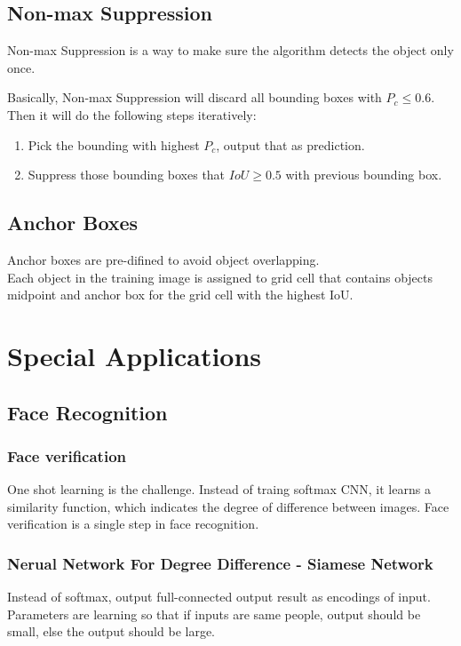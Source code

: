 \documentclass{article}
\begin{document}
	\subsection{Non-max Suppression}
	\begin{flushleft}
		Non-max Suppression is a way to make sure the algorithm detects the object only once.
	\end{flushleft}
	\begin{flushleft}
		Basically, Non-max Suppression will discard all bounding boxes with $P_c \leq 0.6$.\\
		Then it will do the following steps iteratively:
		\begin{enumerate}
			\item Pick the bounding with highest $P_c$, output that as prediction.
			\item Suppress those bounding boxes that $IoU \geq 0.5$ with previous bounding box.
		\end{enumerate}
	\end{flushleft}
	\subsection{Anchor Boxes}
	\begin{flushleft}
		Anchor boxes are pre-difined to avoid object overlapping.\\
		Each object in the training image is assigned to grid cell that contains objects midpoint and anchor box for the grid cell with the highest IoU.
	\end{flushleft}
	
	\section{Special Applications}
	\subsection{Face Recognition}
	\subsubsection{Face verification}
	\begin{flushleft}
		One shot learning is the challenge. Instead of traing softmax CNN, it learns a similarity function, which indicates the degree of difference between images. Face verification is a single step in face recognition.
	\end{flushleft}
	\subsubsection{Nerual Network For Degree Difference - Siamese Network}
	\begin{flushleft}
		Instead of softmax, output full-connected output result as encodings of input. Parameters are learning so that if inputs are same people, output should be small, else the output should be large.
	\end{flushleft}
\end{document}

